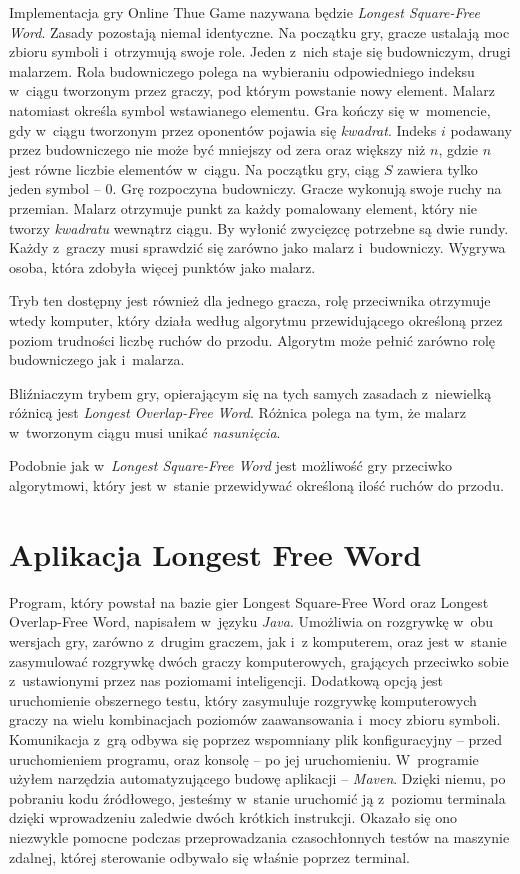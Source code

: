 \documentclass[document]{xmgr}
\begin{document}
Implementacja gry Online Thue Game nazywana będzie \emph{Longest Squa\-re-Free Word}.
Zasady pozostają niemal identyczne. Na początku gry, gracze ustalają moc zbioru symboli i~otrzymują swoje role. Jeden z~nich staje się budowniczym, drugi malarzem. Rola budowniczego polega na wybieraniu odpowiedniego indeksu w~ciągu tworzonym przez graczy, pod którym powstanie nowy element. Malarz natomiast określa symbol wstawianego elementu. Gra kończy się w~momencie, gdy w~ciągu tworzonym przez oponentów pojawia się \emph{kwadrat}. Indeks $i$  podawany przez budowniczego nie może być mniejszy od zera oraz większy niż $n$, gdzie $n$ jest równe liczbie elementów w~ciągu. Na początku gry, ciąg $S$ zawiera tylko jeden symbol -- $0$.
Grę rozpoczyna budowniczy. Gracze wykonują swoje ruchy na przemian. Malarz otrzymuje punkt za każdy pomalowany element, który nie tworzy \emph{kwadratu} wewnątrz ciągu.
By wyłonić zwycięzcę potrzebne są dwie rundy. Każdy z~graczy musi sprawdzić się zarówno jako malarz i~budowniczy. Wygrywa osoba, która zdobyła więcej punktów jako malarz.

Tryb ten dostępny jest również dla jednego gracza, rolę przeciwnika otrzymuje wtedy komputer, który działa według algorytmu przewidującego określoną przez poziom trudności liczbę ruchów do przodu. Algorytm może pełnić zarówno rolę budowniczego jak i~malarza.

Bliźniaczym trybem gry, opierającym się na tych samych zasadach z~niewielką różnicą jest \emph{Longest Overlap-Free Word}. 
Różnica polega na tym, że malarz w~tworzonym ciągu musi unikać \emph{nasunięcia}.

Podobnie jak w~\emph{Longest Square-Free Word} jest możliwość gry przeciwko algorytmowi, który jest w~stanie przewidywać określoną ilość ruchów do przodu.

\chapter{Aplikacja Longest Free Word}
Program, który powstał na bazie gier Longest Square-Free Word oraz Longest Overlap-Free Word, napisałem w~języku \emph{Java}. Umożliwia on rozgrywkę w~obu wersjach gry, zarówno z~drugim graczem, jak i~z komputerem, oraz jest w~stanie zasymulować rozgrywkę dwóch graczy komputerowych, grających przeciwko sobie z~ustawionymi przez nas poziomami inteligencji. Dodatkową opcją jest uruchomienie obszernego testu, który zasymuluje rozgrywkę komputerowych graczy na wielu kombinacjach poziomów zaawansowania i~mocy zbioru symboli. Komunikacja z~grą odbywa się poprzez wspomniany plik konfiguracyjny -- przed uruchomieniem programu, oraz konsolę -- po jej uruchomieniu. W~programie użyłem narzędzia automatyzującego budowę aplikacji -- \emph{Maven}. Dzięki niemu, po pobraniu kodu źródłowego, jesteśmy w~stanie uruchomić ją z~poziomu terminala dzięki wprowadzeniu zaledwie dwóch krótkich instrukcji. Okazało się ono niezwykle pomocne podczas przeprowadzania czasochłonnych testów na maszynie zdalnej, której sterowanie odbywało się właśnie poprzez terminal.
\end{document}

